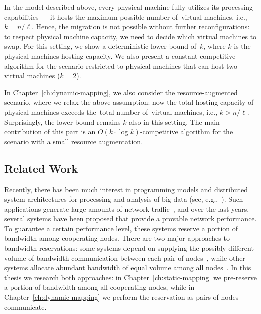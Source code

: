 In the model described above, every physical machine fully utilizes its processing capabilities --- it hosts the maximum possible number of~virtual machines, i.e., $k=n/\ell$.
Hence, the migration is not possible without further reconfigurations: to respect physical machine capacity, we need to decide which virtual machines to swap.
For this setting, we show a deterministic lower bound of~$k$, where $k$ is the physical machines hosting capacity.
We also present a constant-competitive algorithm for the scenario restricted to physical machines that can host two virtual machines ($k = 2$).

In Chapter~\ref{ch:dynamic-mapping}, we also consider the resource-augmented scenario, where we relax the above assumption: now the total hosting capacity of physical machines exceeds the~total number of~virtual machines, i.e., $k > n/\ell$.
Surprisingly, the lower bound remains $k$ also in this setting.
The main contribution of this part is an $O(k\cdot \log k)$-competitive algorithm for the scenario with a small resource augmentation.



\subsection{Related Work}


Recently, there has been much interest in programming models and distributed
system architectures for processing and analysis of big data (see, e.g.,~\cite{mapreduce,nodb,shark}).
Such applications
generate large amounts of network traffic~\cite{orchestra,MogPop12,amazonbw},
and over the last years, several systems have been proposed that provide a provable network performance.
To guarantee a certain performance level, these systems reserve a portion of bandwidth among cooperating nodes.
There are two major approaches to bandwidth reservations: some systems depend on supplying the possibly different volume of bandwidth communication between each pair of nodes~\cite{faircloud,elasticswitch,seawall}, while other systems allocate abundant bandwidth of equal volume among all nodes~\cite{oktopus,secondnet,drl,gatekeeper,proteus}.
In this thesis we research both approaches: in Chapter~\ref{ch:static-mapping} we pre-reserve a portion of bandwidth among all cooperating nodes, while in Chapter~\ref{ch:dynamic-mapping} we perform the reservation as pairs of nodes communicate.


